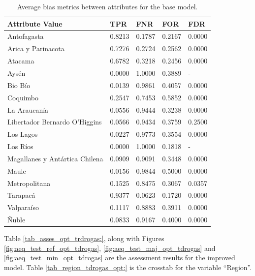 \documentclass[twoside,11pt]{article}
\begin{document}
\begin{table}[ht]
\centering
\begin{tabular}{|p{3.5cm}|p{1cm}|p{1cm}|p{1cm}|p{1cm}|}
\hline

               \textbf{Attribute Value} &    \textbf{TPR} &    \textbf{FNR} &    \textbf{FOR} &    \textbf{FDR} \\ \hline

                   Antofagasta & 0.8213 & 0.1787 & 0.2167 & 0.0000 \\
            Arica y Parinacota & 0.7276 & 0.2724 & 0.2562 & 0.0000 \\
                       Atacama & 0.6782 & 0.3218 & 0.2456 & 0.0000 \\
                         Aysén & 0.0000 & 1.0000 & 0.3889 &    - \\
                       Bio Bío & 0.0139 & 0.9861 & 0.4057 & 0.0000 \\
                      Coquimbo & 0.2547 & 0.7453 & 0.5852 & 0.0000 \\
                  La Araucanía & 0.0556 & 0.9444 & 0.3238 & 0.0000 \\
 Libertador Bernardo O'Higgins & 0.0566 & 0.9434 & 0.3759 & 0.2500 \\
                     Los Lagos & 0.0227 & 0.9773 & 0.3554 & 0.0000 \\
                      Los Ríos & 0.0000 & 1.0000 & 0.1818 &    - \\
Magallanes y Antártica Chilena & 0.0909 & 0.9091 & 0.3448 & 0.0000 \\
                         Maule & 0.0156 & 0.9844 & 0.5000 & 0.0000 \\
                 Metropolitana & 0.1525 & 0.8475 & 0.3067 & 0.0357 \\
                      Tarapacá & 0.9377 & 0.0623 & 0.1720 & 0.0000 \\
                    Valparaíso & 0.1117 & 0.8883 & 0.3911 & 0.0000 \\
                         Ñuble & 0.0833 & 0.9167 & 0.4000 & 0.0000 \\

\hline
\end{tabular}
\caption{Average bias metrics between attributes for the base model.}
\label{tab_region_tdrogas_base:}
\end{table}

Table \ref{tab_asses_opt_trdrogas:}, along with Figures \ref{fig:aeq_test_ref_opt_tdrogas}, \ref{fig:aeq_test_maj_opt_tdrogas} and \ref{fig:aeq_test_min_opt_tdrogas} are the assessment results for the improved model. Table \ref{tab_region_tdrogas_opt:} is the crosstab for the variable ``Region''.
\end{document}

